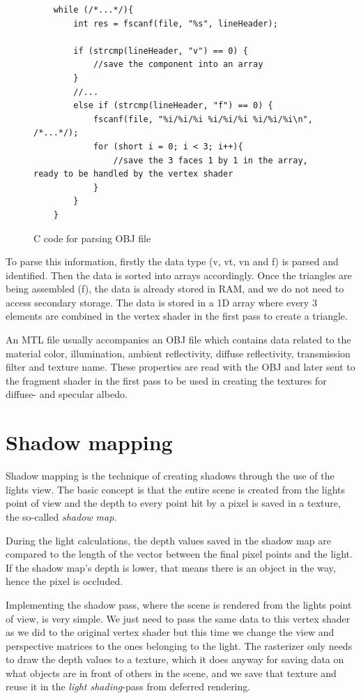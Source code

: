 \documentclass[a4paper,11pt]{article}
\begin{document}
\begin{figure}[ht!]
\begin{lstlisting}
	while (/*...*/){
		int res = fscanf(file, "%s", lineHeader);
		
		if (strcmp(lineHeader, "v") == 0) {
			//save the component into an array
		}
		//...
		else if (strcmp(lineHeader, "f") == 0) {
			fscanf(file, "%i/%i/%i %i/%i/%i %i/%i/%i\n", /*...*/);
			for (short i = 0; i < 3; i++){
				//save the 3 faces 1 by 1 in the array, ready to be handled by the vertex shader
			}
		}
	}
\end{lstlisting}
\caption{C code for parsing OBJ file}
\end{figure}

To parse this information, firstly the data type (v, vt, vn and f) is parsed and identified. Then the data is sorted into arrays accordingly. Once the triangles are being assembled (f), the data is already stored in RAM, and we do not need to access secondary storage. The data is stored in a 1D array where every 3 elements are combined in the vertex shader in the first pass to create a triangle.

An MTL file usually accompanies an OBJ file which contains data related to the material color, illumination, ambient reflectivity, diffuse reflectivity, transmission filter and texture name. These properties are read with the OBJ and later sent to the fragment shader in the first pass to be used in creating the textures for diffuse- and specular albedo.

\newpage
\section{Shadow mapping}
Shadow mapping is the technique of creating shadows through the use of the lights view. The basic concept is that the entire scene is created from the lights point of view and the depth to every point hit by a pixel is saved in a texture, the so-called \textit{shadow map}.

During the light calculations, the depth values saved in the shadow map are compared to the length of the vector between the final pixel points and the light. If the shadow map's depth is lower, that means there is an object in the way, hence the pixel is occluded.

Implementing the shadow pass, where the scene is rendered from the lights point of view, is very simple. We just need to pass the same data to this vertex shader as we did to the original vertex shader but this time we change the view and perspective matrices to the ones belonging to the light. The rasterizer only needs to draw the depth values to a texture, which it does anyway for saving data on what objects are in front of others in the scene, and we save that texture and reuse it in the \textit{light shading}-pass from deferred rendering.
\end{document}
